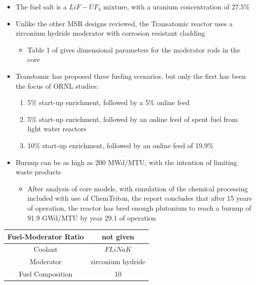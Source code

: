 \documentclass[letterpaper]{article}
\begin{document}
\begin{itemize}
\item The fuel salt is a $LiF - UF_4$ mixture, with a uranium concentration of 27.5\%
\item Unlike the other MSR designs reviewed, the Transatomic reactor uses a zirconium hydride moderator with corrosion resistant cladding
	\begin{itemize}
	\item Table 1 of \cite{robertson_assessment_2017} gives dimensional parameters for the moderator rods in the core
	\end{itemize}
\item Transtomic has proposed three fueling scenarios, but only the first has been the focus of ORNL studies:
	\begin{enumerate}
	\item 5\% start-up enrichment, followed by a 5\% online feed
	\item 5\% start-up enrichment, followed by an online feed of spent fuel from light water reactors
	\item 10\% start-up enrichment, followed by an online feed of 19.9\%
	\end{enumerate}
\item Burnup can be as high as 200 MWd/MTU, with the intention of limiting waste products
	\begin{itemize}
	\item After analysis of core models, with simulation of the chemical processing included with use of ChemTriton, the report concludes that after 15 years of operation, the reactor has bred enough plutonium to reach a burnup of 91.9 GWd/MTU by year 29.1 of operation
	\end{itemize}
\end{itemize}

\begin{center}
\begin{tabular}{|c|c|}
\hline
Fuel-Moderator Ratio & not given \\
\hline
Coolant & $FLiNaK$ \\
\hline
Moderator & zirconium hydride \\
\hline
Fuel Composition & 10 \\
\hline
\end{tabular}
\end{center}




\end{document}
